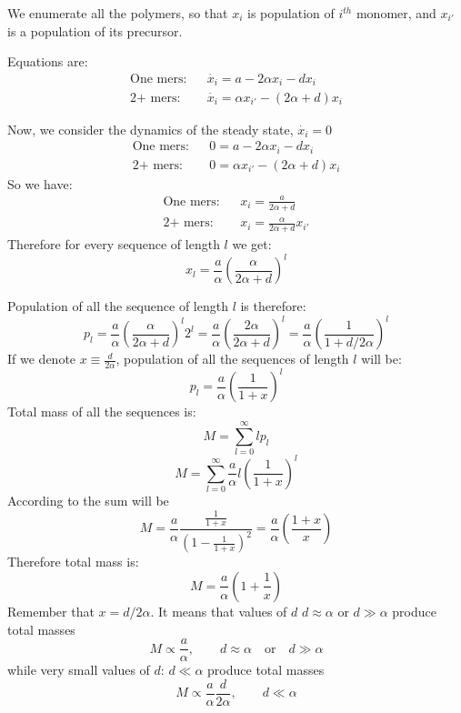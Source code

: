 \documentclass[journal=jacsat,manuscript=article,layout=twocolumn]{achemso}
\newcommand*{\ga}{\alpha}
\newcommand*{\pt}[1]{\left( #1\right)}
\begin{document}
We enumerate all the polymers, so that $x_i$ is population of $i^{th}$ monomer, and $x_{i'}$ is a 
population of its precursor.

Equations are:
  \begin{eqnarray}
   \mbox{One mers:}&& \dot{x_i}=a-2\ga x_i-dx_i \\
     \mbox{2+ mers:}&& \dot{x_i}=\ga x_{i'}-(2\ga+d)x_i
  \end{eqnarray}

Now, we consider the dynamics of the steady state, $\dot{x_i}=0$
  \begin{eqnarray}
   \mbox{One mers:}&& 0=a-2\ga x_i-dx_i \\
     \mbox{2+ mers:}&& 0=\ga x_{i'}-(2\ga+d)x_i
  \end{eqnarray}
  So we have:
   \begin{eqnarray}
   \mbox{One mers:}&& x_i=\frac{a}{2\ga+d} \\
     \mbox{2+ mers:}&& x_i=\frac{\ga}{2\ga+d}x_{i'}
  \end{eqnarray}   
 Therefore for every sequence of length $l$ we get:
   \begin{equation}
   \boxed{ x_l=\frac{a}{\ga}\pt{\frac{\ga}{2\ga+d}}^l}
   \end{equation} 

Population of all the sequence of length $l$ is therefore:
  \begin{equation}
    p_l=\frac{a}{\ga}\pt{\frac{\ga}{2\ga+d}}^l2^l=\frac{a}{\ga}\pt{\frac{2\ga}{2\ga+d}}^l=
    \frac{a}{\ga}\pt{\frac{1}{1+d/2\ga}}^l
  \end{equation} 
If we denote $x\equiv\frac{d}{2\ga}$, population of all the sequences of length $l$ will be:
\begin{equation}
\boxed{ p_l=\frac{a}{\ga}\pt{\frac{1}{1+x}}^l}
\end{equation} 
Total mass of all the sequences is:
\begin{equation}
 M=\sum_{l=0}^{\infty}lp_l
\end{equation} 
\begin{equation}
 M=\sum_{l=0}^{\infty}\frac{a}{\ga}l\pt{\frac{1}{1+x}}^l
\end{equation} 
According to \cite{Gradstein1980} the sum will be
\begin{equation}
 M=\frac{a}{\ga}\frac{\frac{1}{1+x}}{\pt{1-\frac{1}{1+x}}^2}=\frac{a}{\ga}\pt{\frac{1+x}{x}}
\end{equation}
Therefore total mass is:
  \begin{equation}
   M=\frac{a}{\ga}\pt{1+\frac{1}{x}}
  \end{equation} 
Remember that $x=d/2\ga$. It means that values of $d$ $d\approx \ga$ or $d\gg \ga$ produce total 
masses 
\begin{equation}
 M\propto\frac{a}{\ga}, \qquad d\approx \ga\quad \mbox{or}\quad d\gg \ga
\end{equation} 
while very small values of $d:\,d\ll\ga$ produce total masses 
\begin{equation}
M\propto \frac{a}{\ga}\frac{d}{2\ga} ,\qquad d\ll\ga
\end{equation}



 

\end{document}
